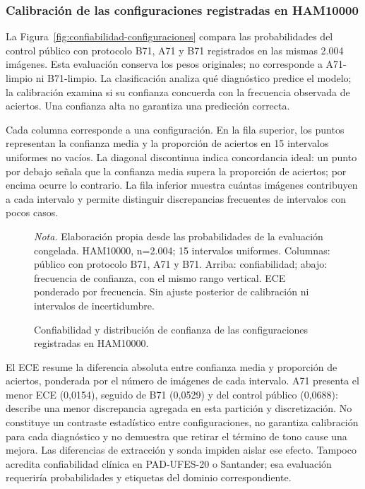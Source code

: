 \FloatBarrier
\subsubsection{Calibración de las configuraciones registradas en HAM10000}

La Figura~\ref{fig:confiabilidad-configuraciones} compara las probabilidades del control público con protocolo B71, A71 y B71 registrados en las mismas 2.004 imágenes. Esta evaluación conserva los pesos originales; no corresponde a A71-limpio ni B71-limpio. La clasificación analiza qué diagnóstico predice el modelo; la calibración examina si su confianza concuerda con la frecuencia observada de aciertos. Una confianza alta no garantiza una predicción correcta.

Cada columna corresponde a una configuración. En la fila superior, los puntos representan la confianza media y la proporción de aciertos en 15 intervalos uniformes no vacíos. La diagonal discontinua indica concordancia ideal: un punto por debajo señala que la confianza media supera la proporción de aciertos; por encima ocurre lo contrario. La fila inferior muestra cuántas imágenes contribuyen a cada intervalo y permite distinguir discrepancias frecuentes de intervalos con pocos casos.

\begin{figure}[!htbp]
\caption{Confiabilidad y distribución de confianza de las configuraciones registradas en HAM10000.}
\label{fig:confiabilidad-configuraciones}
\label{fig:confiabilidad-b71}
\centering

\par\smallskip
{\singlespacing\fontsize{11}{13}\selectfont\raggedright
\noindent\textit{Nota.} Elaboración propia desde las probabilidades de la evaluación congelada. HAM10000, n=2.004; 15 intervalos uniformes. Columnas: público con protocolo B71, A71 y B71. Arriba: confiabilidad; abajo: frecuencia de confianza, con el mismo rango vertical. ECE ponderado por frecuencia. Sin ajuste posterior de calibración ni intervalos de incertidumbre.\par}
\end{figure}
\FloatBarrier

El ECE resume la diferencia absoluta entre confianza media y proporción de aciertos, ponderada por el número de imágenes de cada intervalo. A71 presenta el menor ECE (0,0154), seguido de B71 (0,0529) y del control público (0,0688): describe una menor discrepancia agregada en esta partición y discretización. No constituye un contraste estadístico entre configuraciones, no garantiza calibración para cada diagnóstico y no demuestra que retirar el término de tono cause una mejora. Las diferencias de extracción y sonda impiden aislar ese efecto. Tampoco acredita confiabilidad clínica en PAD-UFES-20 o Santander; esa evaluación requeriría probabilidades y etiquetas del dominio correspondiente.

